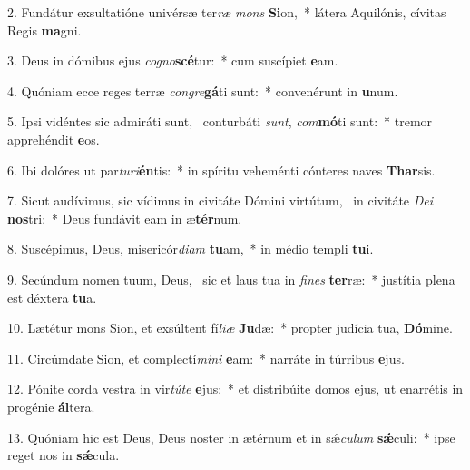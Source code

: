 2. Fundátur exsultatióne univérsæ ter\textit{ræ} \textit{mons} \textbf{Si}on,~*  látera Aquilónis, cívitas Regis \textbf{ma}gni.\

3. Deus in dómibus ejus \textit{co}\textit{gno}\textbf{scé}tur:~*  cum suscípiet \textbf{e}am.\

4. Quóniam ecce reges terræ \textit{con}\textit{gre}\textbf{gá}ti sunt:~*  convenérunt in \textbf{u}num.\

5. Ipsi vidéntes sic admiráti sunt, \dag\  conturbáti \textit{sunt}, \textit{com}\textbf{mó}ti sunt:~*  tremor apprehéndit \textbf{e}os.\

6. Ibi dolóres ut par\textit{tu}\textit{ri}\textbf{én}tis:~*  in spíritu veheménti cónteres naves \textbf{Thar}sis.\

7. Sicut audívimus, sic vídimus in civitáte Dómini virtútum, \dag\  in civitáte \textit{De}\textit{i} \textbf{nos}tri:~*  Deus fundávit eam in æ\textbf{tér}num.\

8. Suscépimus, Deus, misericór\textit{di}\textit{am} \textbf{tu}am,~*  in médio templi \textbf{tu}i.\

9. Secúndum nomen tuum, Deus, \dag\  sic et laus tua in \textit{fi}\textit{nes} \textbf{ter}ræ:~*  justítia plena est déxtera \textbf{tu}a.\

10. Lætétur mons Sion, et exsúltent fí\textit{li}\textit{æ} \textbf{Ju}dæ:~*  propter judícia tua, \textbf{Dó}mine.\

11. Circúmdate Sion, et complectí\textit{mi}\textit{ni} \textbf{e}am:~*  narráte in túrribus \textbf{e}jus.\

12. Pónite corda vestra in vir\textit{tú}\textit{te} \textbf{e}jus:~*  et distribúite domos ejus, ut enarrétis in progénie \textbf{ál}tera.\

13. Quóniam hic est Deus, Deus noster in ætérnum et in sǽ\textit{cu}\textit{lum} \textbf{sǽ}culi:~*  ipse reget nos in \textbf{sǽ}cula.\

